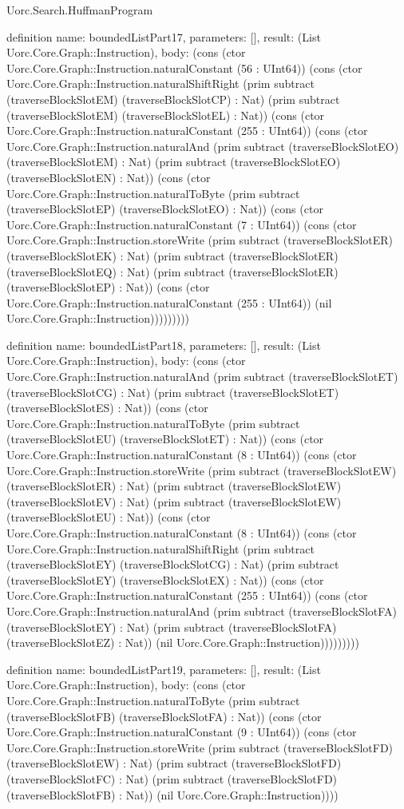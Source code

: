 \begin{lexlean}{Uorc.Search.HuffmanProgram}
\begin{semanticmodule}
definition{
  name: boundedListPart17,
  parameters: [],
  result: (List Uorc.Core.Graph::Instruction),
  body: (cons (ctor Uorc.Core.Graph::Instruction.naturalConstant (56 : UInt64)) (cons (ctor Uorc.Core.Graph::Instruction.naturalShiftRight (prim subtract (traverseBlockSlotEM) (traverseBlockSlotCP) : Nat) (prim subtract (traverseBlockSlotEM) (traverseBlockSlotEL) : Nat)) (cons (ctor Uorc.Core.Graph::Instruction.naturalConstant (255 : UInt64)) (cons (ctor Uorc.Core.Graph::Instruction.naturalAnd (prim subtract (traverseBlockSlotEO) (traverseBlockSlotEM) : Nat) (prim subtract (traverseBlockSlotEO) (traverseBlockSlotEN) : Nat)) (cons (ctor Uorc.Core.Graph::Instruction.naturalToByte (prim subtract (traverseBlockSlotEP) (traverseBlockSlotEO) : Nat)) (cons (ctor Uorc.Core.Graph::Instruction.naturalConstant (7 : UInt64)) (cons (ctor Uorc.Core.Graph::Instruction.storeWrite (prim subtract (traverseBlockSlotER) (traverseBlockSlotEK) : Nat) (prim subtract (traverseBlockSlotER) (traverseBlockSlotEQ) : Nat) (prim subtract (traverseBlockSlotER) (traverseBlockSlotEP) : Nat)) (cons (ctor Uorc.Core.Graph::Instruction.naturalConstant (255 : UInt64)) (nil Uorc.Core.Graph::Instruction)))))))))
}

definition{
  name: boundedListPart18,
  parameters: [],
  result: (List Uorc.Core.Graph::Instruction),
  body: (cons (ctor Uorc.Core.Graph::Instruction.naturalAnd (prim subtract (traverseBlockSlotET) (traverseBlockSlotCG) : Nat) (prim subtract (traverseBlockSlotET) (traverseBlockSlotES) : Nat)) (cons (ctor Uorc.Core.Graph::Instruction.naturalToByte (prim subtract (traverseBlockSlotEU) (traverseBlockSlotET) : Nat)) (cons (ctor Uorc.Core.Graph::Instruction.naturalConstant (8 : UInt64)) (cons (ctor Uorc.Core.Graph::Instruction.storeWrite (prim subtract (traverseBlockSlotEW) (traverseBlockSlotER) : Nat) (prim subtract (traverseBlockSlotEW) (traverseBlockSlotEV) : Nat) (prim subtract (traverseBlockSlotEW) (traverseBlockSlotEU) : Nat)) (cons (ctor Uorc.Core.Graph::Instruction.naturalConstant (8 : UInt64)) (cons (ctor Uorc.Core.Graph::Instruction.naturalShiftRight (prim subtract (traverseBlockSlotEY) (traverseBlockSlotCG) : Nat) (prim subtract (traverseBlockSlotEY) (traverseBlockSlotEX) : Nat)) (cons (ctor Uorc.Core.Graph::Instruction.naturalConstant (255 : UInt64)) (cons (ctor Uorc.Core.Graph::Instruction.naturalAnd (prim subtract (traverseBlockSlotFA) (traverseBlockSlotEY) : Nat) (prim subtract (traverseBlockSlotFA) (traverseBlockSlotEZ) : Nat)) (nil Uorc.Core.Graph::Instruction)))))))))
}

definition{
  name: boundedListPart19,
  parameters: [],
  result: (List Uorc.Core.Graph::Instruction),
  body: (cons (ctor Uorc.Core.Graph::Instruction.naturalToByte (prim subtract (traverseBlockSlotFB) (traverseBlockSlotFA) : Nat)) (cons (ctor Uorc.Core.Graph::Instruction.naturalConstant (9 : UInt64)) (cons (ctor Uorc.Core.Graph::Instruction.storeWrite (prim subtract (traverseBlockSlotFD) (traverseBlockSlotEW) : Nat) (prim subtract (traverseBlockSlotFD) (traverseBlockSlotFC) : Nat) (prim subtract (traverseBlockSlotFD) (traverseBlockSlotFB) : Nat)) (nil Uorc.Core.Graph::Instruction))))
}


\end{semanticmodule}
\end{lexlean}
